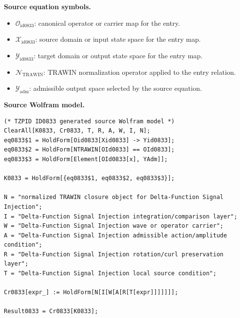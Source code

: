 \begin{minipage}[t]{0.49\linewidth}
\begingroup
\small
\raggedright
\textbf{Source equation symbols.}\par
\begin{itemize}[leftmargin=1.35em,itemsep=1pt,topsep=1pt,parsep=0pt]
    \item $\mathcal{O}_{\mathrm{id0833}}$: canonical operator or carrier map for the entry.
    \item $\mathcal{X}_{\mathrm{id0833}}$: source domain or input state space for the entry map.
    \item $\mathcal{Y}_{\mathrm{id0833}}$: target domain or output state space for the entry map.
    \item $\mathcal{N}_{\mathrm{TRAWIN}}$: TRAWIN normalization operator applied to the entry relation.
    \item $\mathcal{Y}_{\mathrm{adm}}$: admissible output space selected by the source equation.
\end{itemize}
\endgroup
\end{minipage}\hfill
\begin{minipage}[t]{0.47\linewidth}
\begingroup
\scriptsize
\raggedright
\textbf{Source Wolfram model.}\par
\begin{Verbatim}[fontsize=\tiny,breaklines=true,breakanywhere=true]
(* TZPID ID0833 generated source Wolfram model *)
ClearAll[K0833, Cr0833, T, R, A, W, I, N];
eq0833$1 = HoldForm[Oid0833[Xid0833] -> Yid0833];
eq0833$2 = HoldForm[NTRAWIN[OId0833] == OId0833];
eq0833$3 = HoldForm[Element[OId0833[x], YAdm]];

K0833 = HoldForm[{eq0833$1, eq0833$2, eq0833$3}];

N = "normalized TRAWIN closure object for Delta-Function Signal Injection";
I = "Delta-Function Signal Injection integration/comparison layer";
W = "Delta-Function Signal Injection wave or operator carrier";
A = "Delta-Function Signal Injection admissible action/amplitude condition";
R = "Delta-Function Signal Injection rotation/curl preservation layer";
T = "Delta-Function Signal Injection local source condition";

Cr0833[expr_] := HoldForm[N[I[W[A[R[T[expr]]]]]]];

Result0833 = Cr0833[K0833];
\end{Verbatim}
\endgroup
\end{minipage}

